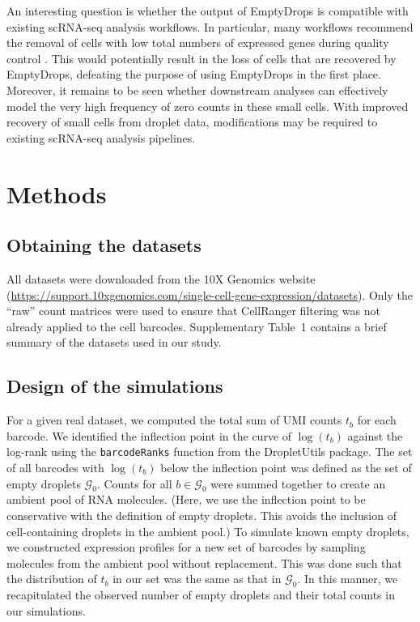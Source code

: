 \documentclass[10pt,letterpaper]{article}
\newcommand{\code}[1]{\texttt{#1}}
\newcommand{\supptabdataset}{1}
\begin{document}

An interesting question is whether the output of EmptyDrops is compatible with existing scRNA-seq analysis workflows.
In particular, many workflows recommend the removal of cells with low total numbers of expressed genes during quality control \cite{lun2016stepbystep,mccarthy2017scater}.
This would potentially result in the loss of cells that are recovered by EmptyDrops, defeating the purpose of using EmptyDrops in the first place.
Moreover, it remains to be seen whether downstream analyses can effectively model the very high frequency of zero counts in these small cells.
With improved recovery of small cells from droplet data, modifications may be required to existing scRNA-seq analysis pipelines.

\section*{Methods}

\subsection*{Obtaining the datasets}
All datasets were downloaded from the 10X Genomics website (\url{https://support.10xgenomics.com/single-cell-gene-expression/datasets}).
Only the ``raw'' count matrices were used to ensure that CellRanger filtering was not already applied to the cell barcodes.
Supplementary Table~\supptabdataset{} contains a brief summary of the datasets used in our study.

\subsection*{Design of the simulations}
For a given real dataset, we computed the total sum of UMI counts $t_b$ for each barcode.
We identified the inflection point in the curve of $\log(t_b)$ against the log-rank using the \code{barcodeRanks} function from the \textsf{DropletUtils} package.
The set of all barcodes with $\log(t_b)$ below the inflection point was defined as the set of empty droplets $\mathcal{G}_0$.
Counts for all $b \in \mathcal{G}_0$ were summed together to create an ambient pool of RNA molecules.
(Here, we use the inflection point to be conservative with the definition of empty droplets.
This avoids the inclusion of cell-containing droplets in the ambient pool.)
To simulate known empty droplets, we constructed expression profiles for a new set of barcodes by sampling molecules from the ambient pool without replacement.
This was done such that the distribution of $t_b$ in our set was the same as that in $\mathcal{G}_0$. 
In this manner, we recapitulated the observed number of empty droplets and their total counts in our simulations.
\end{document}
